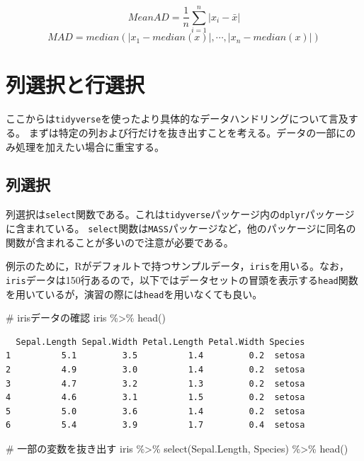 \documentclass[
  a4paper,
]{ltjsbook}
\newenvironment{Shaded}{\begin{snugshade}}{\end{snugshade}}
\newcommand{\CommentTok}[1]{\textcolor[rgb]{0.37,0.37,0.37}{#1}}
\newcommand{\FunctionTok}[1]{\textcolor[rgb]{0.28,0.35,0.67}{#1}}
\newcommand{\NormalTok}[1]{\textcolor[rgb]{0.00,0.23,0.31}{#1}}
\newcommand{\SpecialCharTok}[1]{\textcolor[rgb]{0.37,0.37,0.37}{#1}}
\begin{document}
\[MeanAD = \frac{1}{n}\sum_{i=1}^n|x_i - \bar{x}|\]
\[MAD = median(|x_1-median(x)|,\cdots,|x_n-median(x)|)\]

\section{列選択と行選択}\label{ux5217ux9078ux629eux3068ux884cux9078ux629e}

ここからは\texttt{tidyverse}を使ったより具体的なデータハンドリングについて言及する。
まずは特定の列および行だけを抜き出すことを考える。データの一部にのみ処理を加えたい場合に重宝する。

\subsection{列選択}\label{ux5217ux9078ux629e}

列選択は\texttt{select}関数である。これは\texttt{tidyverse}パッケージ内の\texttt{dplyr}パッケージに含まれている。
\texttt{select}関数は\texttt{MASS}パッケージなど，他のパッケージに同名の関数が含まれることが多いので注意が必要である。

例示のために，Rがデフォルトで持つサンプルデータ，\texttt{iris}を用いる。なお，\texttt{iris}データは150行あるので，以下ではデータセットの冒頭を表示する\texttt{head}関数を用いているが，演習の際には\texttt{head}を用いなくても良い。

\begin{Shaded}
\begin{Highlighting}[]
\CommentTok{\# irisデータの確認}
\NormalTok{iris }\SpecialCharTok{\%\textgreater{}\%} \FunctionTok{head}\NormalTok{()}
\end{Highlighting}
\end{Shaded}

\begin{verbatim}
  Sepal.Length Sepal.Width Petal.Length Petal.Width Species
1          5.1         3.5          1.4         0.2  setosa
2          4.9         3.0          1.4         0.2  setosa
3          4.7         3.2          1.3         0.2  setosa
4          4.6         3.1          1.5         0.2  setosa
5          5.0         3.6          1.4         0.2  setosa
6          5.4         3.9          1.7         0.4  setosa
\end{verbatim}

\begin{Shaded}
\begin{Highlighting}[]
\CommentTok{\# 一部の変数を抜き出す}
\NormalTok{iris }\SpecialCharTok{\%\textgreater{}\%} \FunctionTok{select}\NormalTok{(Sepal.Length, Species) }\SpecialCharTok{\%\textgreater{}\%} \FunctionTok{head}\NormalTok{()}
\end{Highlighting}
\end{Shaded}
\end{document}
